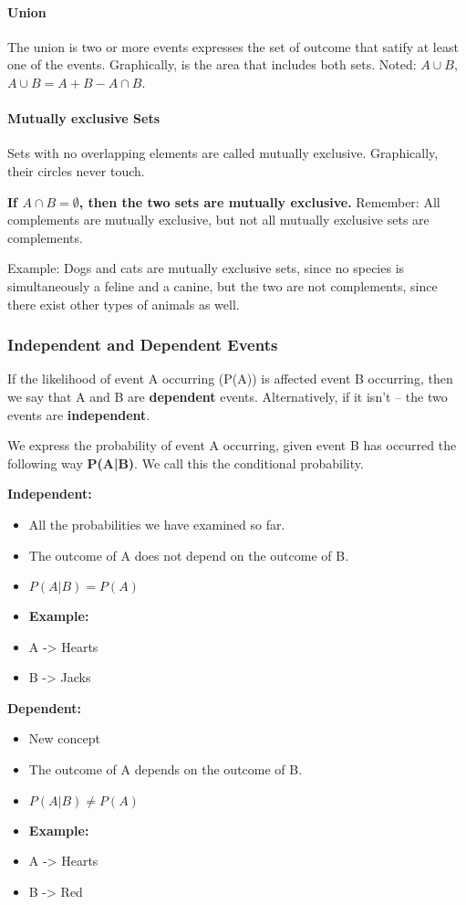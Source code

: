 \documentclass{article}
\begin{document}
\paragraph{Union}
The union is two or more events expresses the set of outcome that satify at
least one of the events. Graphically, is the area that includes both sets.
Noted: $A \cup B$, $A \cup B = A+B-A\cap B$.

\paragraph{Mutually exclusive Sets}
Sets with no overlapping elements are called mutually exclusive. Graphically,
their circles never touch.

\textbf{If $A \cap B = \emptyset$, then the two sets are mutually exclusive.}
Remember: All complements are mutually exclusive, but not all mutually
exclusive sets are complements.

Example: Dogs and cats are mutually exclusive sets, since no species is
simultaneously a feline and a canine, but the two are not complements, since
there exist other types of animals as well.


\subsubsection{Independent and Dependent Events}
If the likelihood of event A occurring (P(A)) is affected event B occurring,
then we say that A and B are \textbf{dependent} events.
Alternatively, if it isn't – the two events are \textbf{independent}.

We express the probability of event A occurring, given event B has occurred the
following way \textbf{P(A|B)}. We call this the conditional probability.

\textbf{Independent:}
\begin{itemize}
  \item All the probabilities we have examined so far.
  \item The outcome of A does not depend on the outcome of B.
  \item $P(A|B)=P(A)$
  \item \textbf{Example:}
  \item A -> Hearts
  \item B -> Jacks
\end{itemize}

\textbf{Dependent:}
\begin{itemize}
  \item New concept
  \item The outcome of A depends on the outcome of B.
  \item $P(A|B)\neq P(A)$
  \item \textbf{Example:}
  \item A -> Hearts
  \item B -> Red
\end{itemize}
\end{document}
